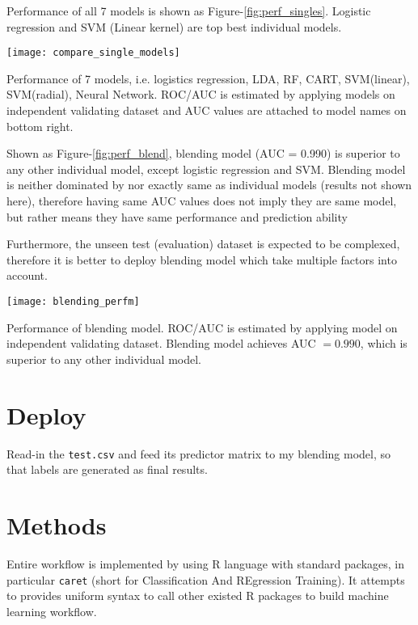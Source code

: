 Performance of all 7 models is shown as Figure-\ref{fig:perf_singles}. Logistic regression and SVM (Linear kernel) are top best individual models.   

\begin{marginfigure}[-1in]
\centering
	\texttt{[image: compare\_single\_models]}
	\caption{Performance of 7 models, i.e. logistics regression, LDA, RF, CART, SVM(linear), SVM(radial), Neural Network. ROC/AUC is estimated by applying models on independent validating dataset and AUC values are attached to model names on bottom right. }
	\label{fig:perf_singles}
\end{marginfigure}

Shown as Figure-\ref{fig:perf_blend}, blending model (AUC = 0.990) is superior to any other individual model, except logistic regression and SVM. Blending model is neither dominated by nor exactly same as individual models (results not shown here), therefore having same AUC values does not imply they are same model, but rather means they have same performance and prediction ability

Furthermore, the unseen test (evaluation) dataset is expected to be complexed, therefore it is better to deploy blending model which take multiple factors into account. 

\begin{marginfigure}
	\centering
	\texttt{[image: blending\_perfm]}
	\caption{Performance of blending model. ROC/AUC is estimated by applying model on independent validating dataset. Blending model achieves AUC $=0.990$, which is superior to any other individual model. }
	\label{fig:perf_blend}
\end{marginfigure}

\section{Deploy}

Read-in the \texttt{test.csv} and feed its predictor matrix to my blending model, so that labels are generated as final results. 

\break
\section{Methods}\label{sec:method}

Entire workflow is implemented by using R language with standard packages, in particular \texttt{caret}\cite{maxcaret} (short for Classification And REgression Training). It attempts to provides uniform syntax to call other existed R packages to build machine learning workflow. 

